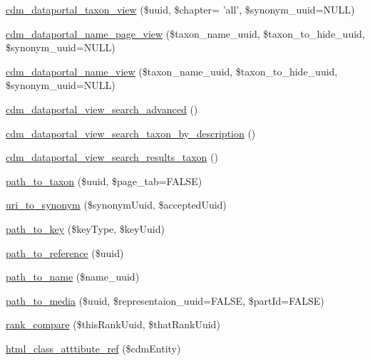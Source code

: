 \begin{DoxyCompactItemize}
\item 
\hyperlink{cdm__dataportal_8module_a79cc398040e2daa21c829e5b216640c6}{cdm\-\_\-dataportal\-\_\-taxon\-\_\-view} (\$uuid, \$chapter= 'all', \$synonym\-\_\-uuid=N\-U\-L\-L)
\item 
\hyperlink{cdm__dataportal_8module_ad8919b33946cd1f8c75ed5f83ae2f724}{cdm\-\_\-dataportal\-\_\-name\-\_\-page\-\_\-view} (\$taxon\-\_\-name\-\_\-uuid, \$taxon\-\_\-to\-\_\-hide\-\_\-uuid, \$synonym\-\_\-uuid=N\-U\-L\-L)
\item 
\hyperlink{cdm__dataportal_8module_a278fcf246e495aa3ca1dc5e44bc953d3}{cdm\-\_\-dataportal\-\_\-name\-\_\-view} (\$taxon\-\_\-name\-\_\-uuid, \$taxon\-\_\-to\-\_\-hide\-\_\-uuid, \$synonym\-\_\-uuid=N\-U\-L\-L)
\item 
\hyperlink{cdm__dataportal_8module_ae9df7f090144cb9d1f3b0cb5c42b5214}{cdm\-\_\-dataportal\-\_\-view\-\_\-search\-\_\-advanced} ()
\item 
\hyperlink{cdm__dataportal_8module_aafc5dce9c0bc5e11a9005e25380c8d44}{cdm\-\_\-dataportal\-\_\-view\-\_\-search\-\_\-taxon\-\_\-by\-\_\-description} ()
\item 
\hyperlink{cdm__dataportal_8module_a7f7c88901037520b47039a906e2fbe1a}{cdm\-\_\-dataportal\-\_\-view\-\_\-search\-\_\-results\-\_\-taxon} ()
\item 
\hyperlink{cdm__dataportal_8module_a36efde6d6d88a96c5bf1096edd8d62d7}{path\-\_\-to\-\_\-taxon} (\$uuid, \$page\-\_\-tab=F\-A\-L\-S\-E)
\item 
\hyperlink{cdm__dataportal_8module_a412e3357d8187c10339bc4cfc43fcd45}{uri\-\_\-to\-\_\-synonym} (\$synonym\-Uuid, \$accepted\-Uuid)
\item 
\hyperlink{cdm__dataportal_8module_a25f2ee3828e31be9a6772cbb7a819736}{path\-\_\-to\-\_\-key} (\$key\-Type, \$key\-Uuid)
\item 
\hyperlink{cdm__dataportal_8module_a94991923be128f241758d0d0e966334b}{path\-\_\-to\-\_\-reference} (\$uuid)
\item 
\hyperlink{cdm__dataportal_8module_acaa3b2cd7a2d5f3f99d3692818cc41c5}{path\-\_\-to\-\_\-name} (\$name\-\_\-uuid)
\item 
\hyperlink{cdm__dataportal_8module_a1c4a9913c1e63bcb3e5cf88e5c7a4086}{path\-\_\-to\-\_\-media} (\$uuid, \$representaion\-\_\-uuid=F\-A\-L\-S\-E, \$part\-Id=F\-A\-L\-S\-E)
\item 
\hyperlink{cdm__dataportal_8module_a3c773b5ed743ec1326d773a5fda492b8}{rank\-\_\-compare} (\$this\-Rank\-Uuid, \$that\-Rank\-Uuid)
\item 
\hyperlink{cdm__dataportal_8module_ae5d9dcb315c1b08cd7f51cf62591cfb8}{html\-\_\-class\-\_\-atttibute\-\_\-ref} (\$cdm\-Entity)

\end{DoxyCompactItemize}
